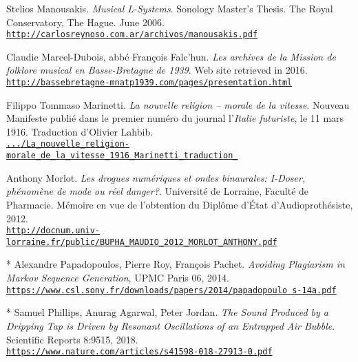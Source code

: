\begin{thebibliography}{99}
	Stelios Manousakis. \textit{Musical L-Systems}. Sonology Master's Thesis. The Royal Conservatory, The Hague. June 2006.\\ \href{http://carlosreynoso.com.ar/archivos/manousakis.pdf}{\scriptsize{\texttt{http://carlosreynoso.com.ar/archivos/manousakis.pdf}}} \normalsize{}
	
	Claudie Marcel-Dubois, abb\'e François Falc'hun. \textit{Les archives de la Mission de folklore musical en Basse-Bretagne de 1939}. Web site retrieved in 2016.\\ 
	\href{http://bassebretagne-mnatp1939.com/pages/presentation.html}{\scriptsize{\texttt{http://bassebretagne-mnatp1939.com/pages/presentation.html}}} \normalsize{}
	
	Filippo Tommaso Marinetti. \textit{La nouvelle religion -- morale de la vitesse}. Nouveau Manifeste publié dans le premier numéro du journal l'\textit{Italie futuriste}, le 11 mars 1916. Traduction d'Olivier Lahbib.\\ 
	\href{https://www.academia.edu/12024655/La\_nouvelle\_religion-morale\_de\_la\_vitesse\_1916\_Marinetti\_traduction\_}{\scriptsize{\texttt{.../La\_nouvelle\_religion-morale\_de\_la\_vitesse\_1916\_Marinetti\_traduction\_}}} \normalsize{}
	
	
	Anthony Morlot. \textit{Les drogues num\'eriques et ondes
binaurales: I-Doser, ph\'enom\`ene de mode ou r\'eel danger?}. Universit\'e de Lorraine, Facult\'e de Pharmacie. M\'emoire en vue de l'obtention du Dipl\^ome d'\'Etat d'Audioproth\'esiste, 2012.\\ 
	\href{http://docnum.univ-lorraine.fr/public/BUPHA\_MAUDIO\_2012\_MORLOT\_ANTHONY.pdf}{\scriptsize{\texttt{http://docnum.univ-lorraine.fr/public/BUPHA\_MAUDIO\_2012\_MORLOT\_ANTHONY.pdf}}} \normalsize{}
	
	* Alexandre Papadopoulos, Pierre Roy, Fran\c cois Pachet. \textit{Avoiding Plagiarism in Markov Sequence Generation}, UPMC Paris 06, 2014.\\ \href{https://www.csl.sony.fr/downloads/papers/2014/papadopoulo s-14a.pdf}{\scriptsize{\texttt{https://www.csl.sony.fr/downloads/papers/2014/papadopoulo s-14a.pdf}}} \normalsize{}
	
	* Samuel Phillips,  Anurag Agarwal, Peter Jordan. \textit{The Sound Produced by a Dripping Tap is Driven by Resonant Oscillations of an Entrapped Air Bubble}. Scientific Reports 8:9515, 2018.\\ 
	\href{https://www.nature.com/articles/s41598-018-27913-0}{\scriptsize{\texttt{https://www.nature.com/articles/s41598-018-27913-0.pdf}}} \normalsize{}
	

\end{thebibliography}
